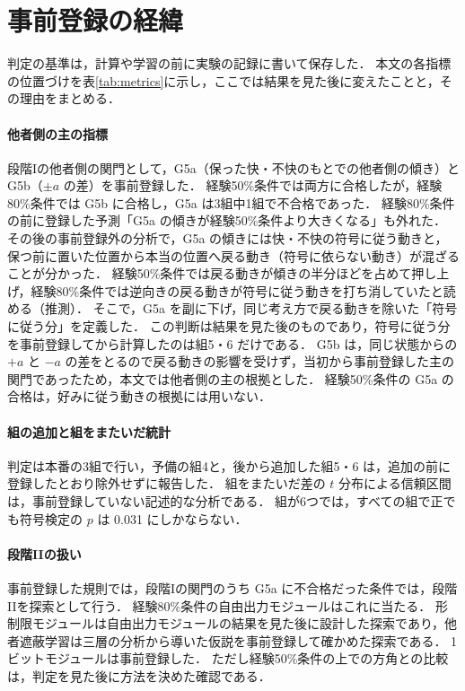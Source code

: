\section{事前登録の経緯}\label{app:prereg}
判定の基準は，計算や学習の前に実験の記録に書いて保存した．
本文の各指標の位置づけを表\ref{tab:metrics}に示し，ここでは結果を見た後に変えたことと，その理由をまとめる．

\paragraph{他者側の主の指標}
段階Iの他者側の関門として，G5a（保った快・不快のもとでの他者側の傾き）と G5b（$\pm a$ の差）を事前登録した．
経験50\%条件では両方に合格したが，経験80\%条件では G5b に合格し，G5a は3組中1組で不合格であった．
経験80\%条件の前に登録した予測「G5a の傾きが経験50\%条件より大きくなる」も外れた．
その後の事前登録外の分析で，G5a の傾きには快・不快の符号に従う動きと，保つ前に置いた位置から本当の位置へ戻る動き（符号に依らない動き）が混ざることが分かった．
経験50\%条件では戻る動きが傾きの半分ほどを占めて押し上げ，経験80\%条件では逆向きの戻る動きが符号に従う動きを打ち消していたと読める（推測）．
そこで，G5a を副に下げ，同じ考え方で戻る動きを除いた「符号に従う分」を定義した．
この判断は結果を見た後のものであり，符号に従う分を事前登録してから計算したのは組5・6 だけである．
G5b は，同じ状態からの $+a$ と $-a$ の差をとるので戻る動きの影響を受けず，当初から事前登録した主の関門であったため，本文では他者側の主の根拠とした．
経験50\%条件の G5a の合格は，好みに従う動きの根拠には用いない．

\paragraph{組の追加と組をまたいだ統計}
判定は本番の3組で行い，予備の組4と，後から追加した組5・6 は，追加の前に登録したとおり除外せずに報告した．
組をまたいだ差の $t$ 分布による信頼区間は，事前登録していない記述的な分析である．
組が6つでは，すべての組で正でも符号検定の $p$ は 0.031 にしかならない．

\paragraph{段階IIの扱い}
事前登録した規則では，段階Iの関門のうち G5a に不合格だった条件では，段階IIを探索として行う．
経験80\%条件の自由出力モジュールはこれに当たる．
形制限モジュールは自由出力モジュールの結果を見た後に設計した探索であり，他者遮蔽学習は三層の分析から導いた仮説を事前登録して確かめた探索である．
1ビットモジュールは事前登録した．
ただし経験50\%条件の上での方角との比較は，判定を見た後に方法を決めた確認である．

